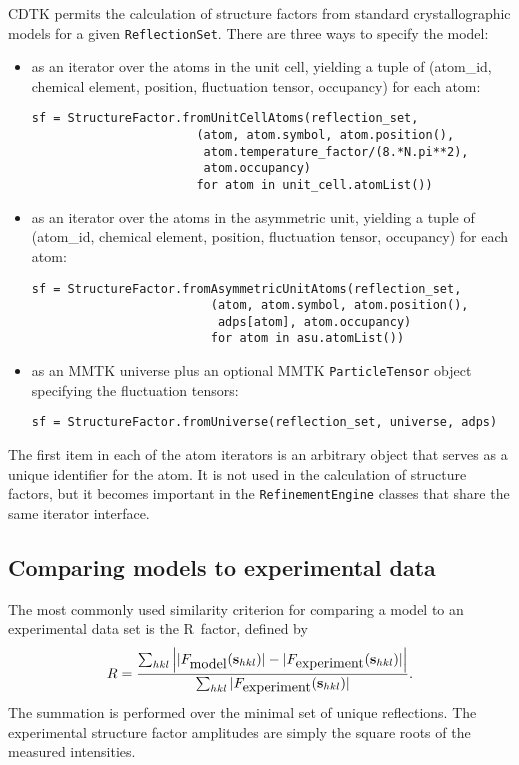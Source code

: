 \documentclass[11pt]{article}
\newcommand{\vect}[1]{{\bf #1}}
\newcommand{\vs}{\vect{s}}
\begin{document}
\begin{sloppy}
CDTK permits the calculation of structure factors from standard
crystallographic models for a given \texttt{ReflectionSet}.
There are three ways to specify the model:
\begin{itemize}
\item
as an iterator over the atoms in the unit cell, yielding a tuple
of (atom\_id, chemical element, position, fluctuation tensor, occupancy)
for each atom:
{\small
\begin{verbatim}
sf = StructureFactor.fromUnitCellAtoms(reflection_set,
                       (atom, atom.symbol, atom.position(),
                        atom.temperature_factor/(8.*N.pi**2),
                        atom.occupancy)
                       for atom in unit_cell.atomList())
\end{verbatim}
}
\item
as an iterator over the atoms in the asymmetric unit, yielding a tuple
of (atom\_id, chemical element, position, fluctuation tensor, occupancy)
for each atom:
{\small
\begin{verbatim}
sf = StructureFactor.fromAsymmetricUnitAtoms(reflection_set,
                         (atom, atom.symbol, atom.position(),
                          adps[atom], atom.occupancy)
                         for atom in asu.atomList())
\end{verbatim}
}
\item
as an MMTK universe plus an optional MMTK \texttt{ParticleTensor} object
specifying the fluctuation tensors:
{\small
\begin{verbatim}
sf = StructureFactor.fromUniverse(reflection_set, universe, adps)
\end{verbatim}
}
\end{itemize}
The first item in each of the atom iterators is an arbitrary object
that serves as a unique identifier for the atom. It is not used
in the calculation of structure factors, but it becomes important
in the \texttt{RefinementEngine} classes that share the same
iterator interface.

\subsection{Comparing models to experimental data}

The most commonly used similarity criterion for comparing a model
to an experimental data set is the R~factor, defined by
\begin{equation}
R = \frac{\sum_{hkl}
    \left| |F_{\mbox{model}}(\vs_{hkl})|-|F_{\mbox{experiment}}(\vs_{hkl})| \right|}
    {\sum_{hkl} |F_{\mbox{experiment}}(\vs_{hkl})|}.
\end{equation}
The summation is performed over the minimal set of unique reflections.
The experimental structure factor amplitudes are simply the square roots
of the measured intensities.


\end{sloppy}
\end{document}
